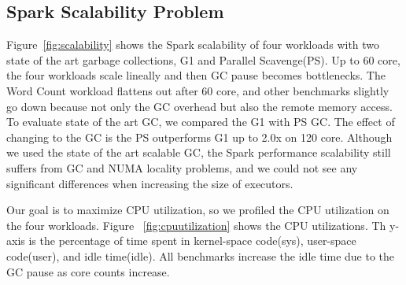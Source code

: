 \else

\fi

\subsection{Spark Scalability Problem}
Figure~\ref{fig:scalability} shows the Spark scalability of four workloads with
two state of the art garbage collections, G1 and Parallel Scavenge(PS).
Up to 60 core, the four workloads scale lineally and then GC pause becomes bottlenecks.
The Word Count workload flattens out after 60 core, and other benchmarks slightly go
down because not only the GC overhead but also the remote memory access. 
To evaluate state of the art GC, we compared the G1 with PS GC.
The effect of changing to the GC is the PS outperforms G1 up to 2.0x on 120 core.
Although we used the state of the art scalable GC,
the Spark performance scalability still suffers from GC and NUMA locality problems, and
we could not see any significant differences when increasing the size
of executors.


Our goal is to maximize CPU utilization, so we profiled the CPU utilization
on the four workloads.
Figure ~\ref{fig:cpuutilization} shows the CPU utilizations.
Th y-axis is the percentage of time spent in kernel-space code(sys), user-space
code(user), and idle time(idle).
All benchmarks increase the idle time due to the GC pause as core counts increase.

\ifkor
\else

